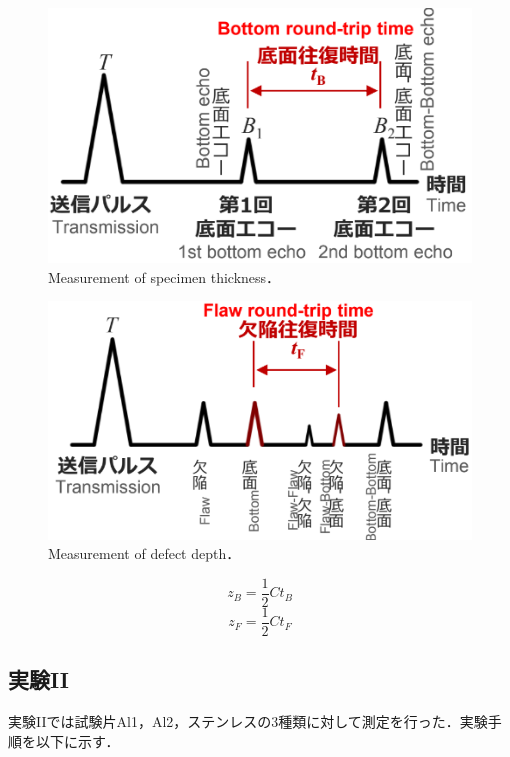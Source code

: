 \begin{figure}[htbp]
    \centering %
    \includegraphics[width=100truemm,clip]{fig/試験体厚さ.png}
    \caption{Measurement of specimen thickness．}
    \label{fig:試験体厚さ}
\end{figure}
\begin{figure}[htbp]
    \centering %
    \includegraphics[width=100truemm,clip]{fig/欠陥深さ.png}
    \caption{Measurement of defect depth．}
    \label{fig:欠陥深さ}
\end{figure}
\begin{equation}
    \label{eq:試験片厚さ}
    z_B = \frac{1}{2}Ct_B
\end{equation}
\begin{equation}
    \label{eq:欠陥深さ}
    z_F = \frac{1}{2}Ct_F
\end{equation}

\subsection{実験II}
実験IIでは試験片Al1，Al2，ステンレスの3種類に対して測定を行った．実験手順を以下に示す．

